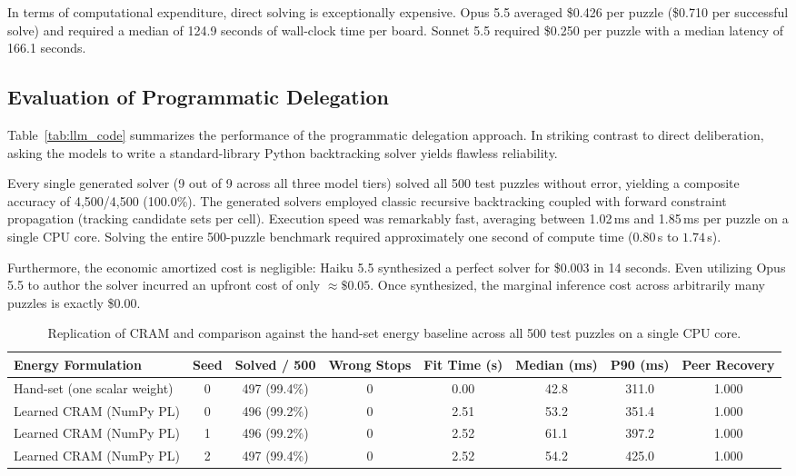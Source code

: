 \documentclass{article} %
\begin{document}
In terms of computational expenditure, direct solving is exceptionally expensive. Opus 5.5 averaged \$0.426 per puzzle (\$0.710 per successful solve) and required a median of 124.9 seconds of wall-clock time per board. Sonnet 5.5 required \$0.250 per puzzle with a median latency of 166.1 seconds.

\subsection{Evaluation of Programmatic Delegation}
Table~\ref{tab:llm_code} summarizes the performance of the programmatic delegation approach. In striking contrast to direct deliberation, asking the models to write a standard-library Python backtracking solver yields flawless reliability.

Every single generated solver (9 out of 9 across all three model tiers) solved all 500 test puzzles without error, yielding a composite accuracy of 4,500/4,500 (100.0\%). The generated solvers employed classic recursive backtracking coupled with forward constraint propagation (tracking candidate sets per cell). Execution speed was remarkably fast, averaging between 1.02\,ms and 1.85\,ms per puzzle on a single CPU core. Solving the entire 500-puzzle benchmark required approximately one second of compute time ($0.80$\,s to $1.74$\,s).

Furthermore, the economic amortized cost is negligible: Haiku 5.5 synthesized a perfect solver for \$0.003 in 14 seconds. Even utilizing Opus 5.5 to author the solver incurred an upfront cost of only $\approx \$0.05$. Once synthesized, the marginal inference cost across arbitrarily many puzzles is exactly \$0.00.

\begin{table}[t]
\centering
\small
\caption{Replication of CRAM \citep{hoover2026classical} and comparison against the hand-set energy baseline across all 500 test puzzles on a single CPU core.}
\label{tab:cram_results}
\begin{tabular}{lccccccc}
\toprule
\textbf{Energy Formulation} & \textbf{Seed} & \textbf{Solved / 500} & \textbf{Wrong Stops} & \textbf{Fit Time (s)} & \textbf{Median (ms)} & \textbf{P90 (ms)} & \textbf{Peer Recovery} \\
\midrule
Hand-set (one scalar weight) & 0 & 497 (99.4\%) & 0 & 0.00 & 42.8 & 311.0 & 1.000 \\
Learned CRAM (NumPy PL)      & 0 & 496 (99.2\%) & 0 & 2.51 & 53.2 & 351.4 & 1.000 \\
Learned CRAM (NumPy PL)      & 1 & 496 (99.2\%) & 0 & 2.52 & 61.1 & 397.2 & 1.000 \\
Learned CRAM (NumPy PL)      & 2 & 497 (99.4\%) & 0 & 2.52 & 54.2 & 425.0 & 1.000 \\
\bottomrule
\end{tabular}
\end{table}
\end{document}
